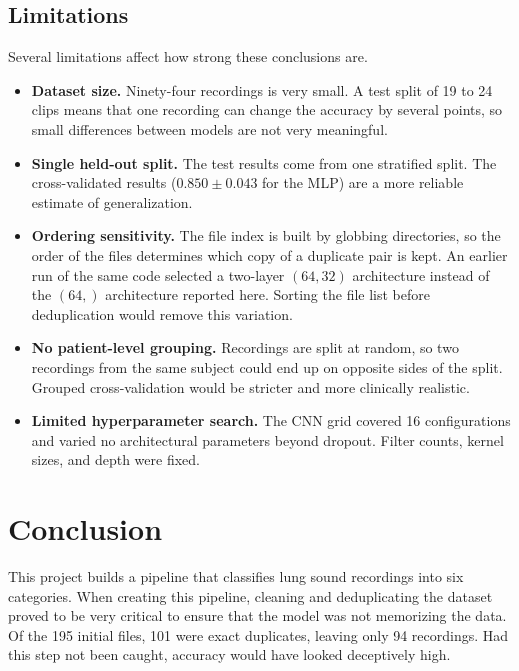 \documentclass[conference]{IEEEtran}
\begin{document}
\subsection{Limitations}
Several limitations affect how strong these conclusions are.

\begin{itemize}
    \item \textbf{Dataset size.} Ninety-four recordings is very small. A test
    split of 19 to 24 clips means that one recording can change the accuracy by
    several points, so small differences between models are not very meaningful.
    \item \textbf{Single held-out split.} The test results come from one
    stratified split. The cross-validated results ($0.850 \pm 0.043$ for the MLP)
    are a more reliable estimate of generalization.
    \item \textbf{Ordering sensitivity.} The file index is built by globbing
    directories, so the order of the files determines which copy of a duplicate
    pair is kept. An earlier run of the same code selected a two-layer $(64,
    32)$ architecture instead of the $(64,)$ architecture reported here. Sorting
    the file list before deduplication would remove this variation.
    \item \textbf{No patient-level grouping.} Recordings are split at random, so
    two recordings from the same subject could end up on opposite sides of the
    split. Grouped cross-validation would be stricter and more clinically
    realistic.
    \item \textbf{Limited hyperparameter search.} The CNN grid covered 16
    configurations and varied no architectural parameters beyond dropout. Filter
    counts, kernel sizes, and depth were fixed.
\end{itemize}

\section{Conclusion}

This project builds a pipeline that classifies lung sound recordings into six
categories. When creating this pipeline, cleaning and deduplicating the dataset
proved to be very critical to ensure that the model was not memorizing the data.
Of the 195 initial files, 101 were exact duplicates, leaving only 94 recordings.
Had this step not been caught, accuracy would have looked deceptively high.
\end{document}
